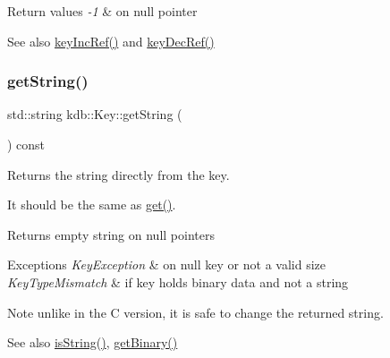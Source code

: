 \begin{DoxyRetVals}{Return values}
{\em -\/1} & on null pointer \\
\hline
\end{DoxyRetVals}
\begin{DoxySeeAlso}{See also}
\mbox{\hyperlink{group__key_ga6970a6f254d67af7e39f8e469bb162f1}{key\+Inc\+Ref()}} and \mbox{\hyperlink{group__key_ga2c6433ca22109e4e141946057eccb283}{key\+Dec\+Ref()}} 
\end{DoxySeeAlso}
\mbox{\label{classkdb_1_1Key_af612ede3a73e57b317a65e40e7f9e01b}} 
\subsubsection{\texorpdfstring{getString()}{getString()}}
{\footnotesize\ttfamily std\+::string kdb\+::\+Key\+::get\+String (\begin{DoxyParamCaption}{ }\end{DoxyParamCaption}) const\hspace{0.3cm}{\ttfamily [inline]}}

\begin{DoxyReturn}{Returns}
the string directly from the key.
\end{DoxyReturn}
It should be the same as \mbox{\hyperlink{classkdb_1_1Key_ac558a1f1b2cb50d77fbabcbb24950c05}{get()}}. \begin{DoxyReturn}{Returns}
empty string on null pointers
\end{DoxyReturn}

\begin{DoxyExceptions}{Exceptions}
{\em Key\+Exception} & on null key or not a valid size \\
\hline
{\em Key\+Type\+Mismatch} & if key holds binary data and not a string\\
\hline
\end{DoxyExceptions}
\begin{DoxyNote}{Note}
unlike in the C version, it is safe to change the returned string.
\end{DoxyNote}
\begin{DoxySeeAlso}{See also}
\mbox{\hyperlink{classkdb_1_1Key_a2170b1d9decef951b478454e3ee0b618}{is\+String()}}, \mbox{\hyperlink{classkdb_1_1Key_ada114aba31b321ddc984018b43a8568b}{get\+Binary()}} 
\end{DoxySeeAlso}
\mbox{\label{classkdb_1_1Key_a4cfc9941a93a94b306b8264d0d21abc2}} 
